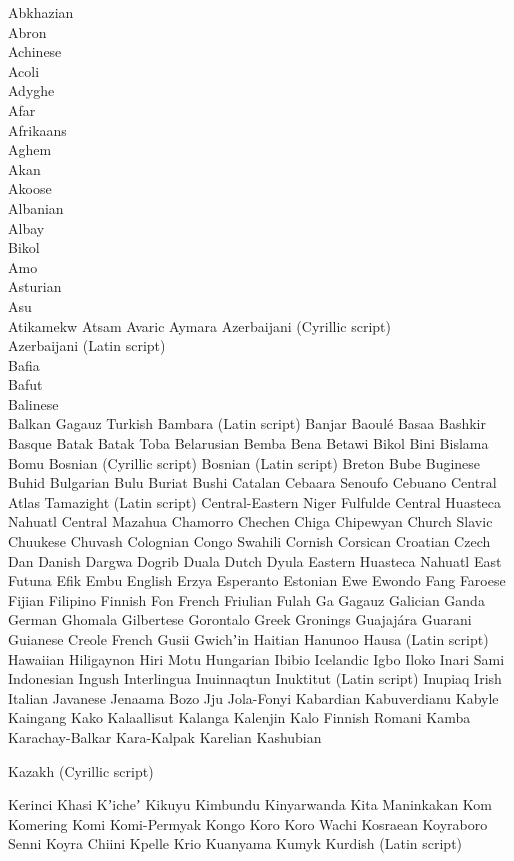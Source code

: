 \begin{multicols}{5}
\raggedright
Abkhazian\\
Abron\\
Achinese\\
Acoli\\
Adyghe\\
Afar\\
Afrikaans\\
Aghem\\
Akan\\
Akoose\\
Albanian\\
Albay\\
Bikol\\
Amo\\
Asturian\\
Asu\\
Atikamekw
Atsam
Avaric
Aymara
Azerbaijani (Cyrillic script)\\
Azerbaijani (Latin script)\\
Bafia\\
Bafut\\
Balinese\\
Balkan Gagauz Turkish
Bambara (Latin script)
Banjar
Baoulé
Basaa
Bashkir
Basque
Batak
Batak Toba
Belarusian
Bemba
Bena
Betawi
Bikol
Bini
Bislama
Bomu
Bosnian (Cyrillic script)
Bosnian (Latin script)
Breton
Bube
Buginese
Buhid
Bulgarian
Bulu
Buriat
Bushi
Catalan
Cebaara Senoufo
Cebuano
Central Atlas Tamazight (Latin script)
Central-Eastern Niger Fulfulde
Central Huasteca Nahuatl
Central Mazahua
Chamorro
Chechen
Chiga
Chipewyan
Church Slavic
Chuukese
Chuvash
Colognian
Congo Swahili
Cornish
Corsican
Croatian
Czech
Dan
Danish
Dargwa
Dogrib
Duala
Dutch
Dyula
Eastern Huasteca Nahuatl
East Futuna
Efik
Embu
English
Erzya
Esperanto
Estonian
Ewe
Ewondo
Fang
Faroese
Fijian
Filipino
Finnish
Fon
French
Friulian
Fulah
Ga
Gagauz
Galician
Ganda
German
Ghomala
Gilbertese
Gorontalo
Greek
Gronings
Guajajára
Guarani
Guianese Creole French
Gusii
Gwichʼin
Haitian
Hanunoo
Hausa (Latin script)
Hawaiian
Hiligaynon
Hiri Motu
Hungarian
Ibibio
Icelandic
Igbo
Iloko
Inari Sami
Indonesian
Ingush
Interlingua
Inuinnaqtun
Inuktitut (Latin script)
Inupiaq
Irish
Italian
Javanese
Jenaama Bozo
Jju
Jola-Fonyi
Kabardian
Kabuverdianu
Kabyle
Kaingang
Kako
Kalaallisut
Kalanga
Kalenjin
Kalo Finnish Romani
Kamba
Karachay-Balkar
Kara-Kalpak
Karelian
Kashubian

Kazakh (Cyrillic script)

Kerinci
Khasi
Kʼicheʼ
Kikuyu
Kimbundu
Kinyarwanda
Kita Maninkakan
Kom
Komering
Komi
Komi-Permyak
Kongo
Koro
Koro Wachi
Kosraean
Koyraboro Senni
Koyra Chiini
Kpelle
Krio
Kuanyama
Kumyk
Kurdish (Latin script)


\end{multicols}
